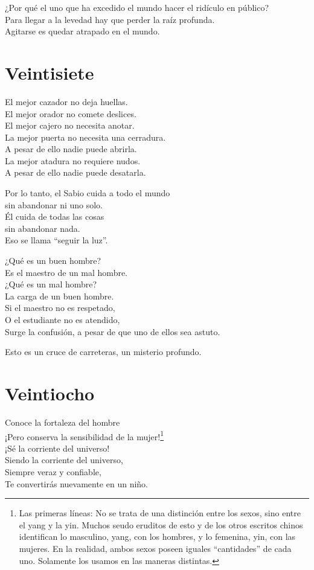 \documentclass[hidelinks]{memoir}
\begin{document}
	¿Por qué el uno que ha excedido el mundo hacer el ridículo en público?\\
	Para llegar a la levedad hay que perder la raíz profunda.\\
	Agitarse es quedar atrapado en el mundo.
	
	\chapter*{Veintisiete}
	
	El mejor cazador no deja huellas.\\
	El mejor orador no comete deslices.\\
	El mejor cajero no necesita anotar.\\
	La mejor puerta no necesita una cerradura.\\
	A pesar de ello nadie puede abrirla.\\
	La mejor atadura no requiere nudos.\\
	A pesar de ello nadie puede desatarla.
	
	Por lo tanto, el Sabio cuida a todo el mundo\\
	sin abandonar ni uno solo.\\
	Él cuida de todas las cosas\\
	sin abandonar nada.\\
	Eso se llama ``seguir la luz''.
	
	¿Qué es un buen hombre?\\
	Es el maestro de un mal hombre.\\
	¿Qué es un mal hombre?\\
	La carga de un buen hombre.\\
	Si el maestro no es respetado,\\
	O el estudiante no es atendido,\\
	Surge la confusión, a pesar de que uno de ellos sea astuto.
	
	Esto es un cruce de carreteras, un misterio profundo.
	
	\chapter*{Veintiocho}
	
	Conoce la fortaleza del hombre\\
	¡Pero conserva la sensibilidad de la mujer!\footnote{Las primeras líneas: No se trata de una distinción entre los sexos, sino
		entre el yang y la yin. Muchos seudo eruditos de esto y de los otros
		escritos chinos identifican lo masculino, yang, con los hombres, y lo
		femenina, yin, con las mujeres. En la realidad, ambos sexos poseen
		iguales ``cantidades'' de cada uno. Solamente los usamos en las maneras
		distintas.}\\
	¡Sé la corriente del universo!\\
	Siendo la corriente del universo,\\
	Siempre veraz y confiable,\\
	Te convertirás nuevamente en un niño.
	
\end{document}
